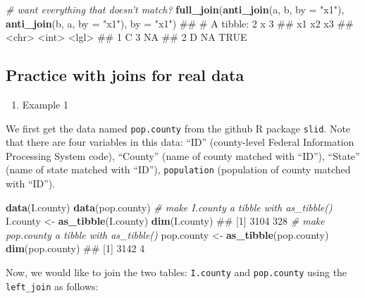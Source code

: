 \documentclass[]{book}
\newenvironment{Shaded}{\begin{snugshade}}{\end{snugshade}}
\newcommand{\KeywordTok}[1]{\textcolor[rgb]{0.13,0.29,0.53}{\textbf{#1}}}
\newcommand{\DataTypeTok}[1]{\textcolor[rgb]{0.13,0.29,0.53}{#1}}
\newcommand{\StringTok}[1]{\textcolor[rgb]{0.31,0.60,0.02}{#1}}
\newcommand{\CommentTok}[1]{\textcolor[rgb]{0.56,0.35,0.01}{\textit{#1}}}
\newcommand{\NormalTok}[1]{#1}
\providecommand{\tightlist}{%
  \setlength{\itemsep}{0pt}\setlength{\parskip}{0pt}}
\begin{document}
\begin{Shaded}
\begin{Highlighting}[]
\CommentTok{# want everything that doesn't match?}
\KeywordTok{full_join}\NormalTok{(}\KeywordTok{anti_join}\NormalTok{(a, b, }\DataTypeTok{by =} \StringTok{"x1"}\NormalTok{), }
\KeywordTok{anti_join}\NormalTok{(b, a, }\DataTypeTok{by =} \StringTok{"x1"}\NormalTok{), }\DataTypeTok{by =} \StringTok{"x1"}\NormalTok{)}
\NormalTok{## # A tibble: 2 x 3}
\NormalTok{##   x1       x2 x3   }
\NormalTok{##   <chr> <int> <lgl>}
\NormalTok{## 1 C         3 NA   }
\NormalTok{## 2 D        NA TRUE}
\end{Highlighting}
\end{Shaded}

\subsection{Practice with joins for real
data}\label{practice-with-joins-for-real-data}

\begin{enumerate}
\def\labelenumi{\arabic{enumi}.}
\tightlist
\item
  Example 1
\end{enumerate}

We first get the data named \texttt{pop.county} from the github R
package \texttt{slid}. Note that there are four variables in this data:
``ID'' (county-level Federal Information Processing System code),
``County'' (name of county matched with ``ID''), ``State'' (name of
state matched with ``ID''), \texttt{population} (population of county
matched with ``ID'').

\begin{Shaded}
\begin{Highlighting}[]
\KeywordTok{data}\NormalTok{(I.county)}
\KeywordTok{data}\NormalTok{(pop.county)}
\CommentTok{# make I.county a tibble with as_tibble()}
\NormalTok{I.county <-}\StringTok{ }\KeywordTok{as_tibble}\NormalTok{(I.county)}
\KeywordTok{dim}\NormalTok{(I.county)}
\NormalTok{## [1] 3104  328}
\CommentTok{# make pop.county a tibble with as_tibble()}
\NormalTok{pop.county <-}\StringTok{ }\KeywordTok{as_tibble}\NormalTok{(pop.county)}
\KeywordTok{dim}\NormalTok{(pop.county)}
\NormalTok{## [1] 3142    4}
\end{Highlighting}
\end{Shaded}

Now, we would like to join the two tables: \texttt{I.county} and
\texttt{pop.county} using the \texttt{left\_join} as follows:
\end{document}
